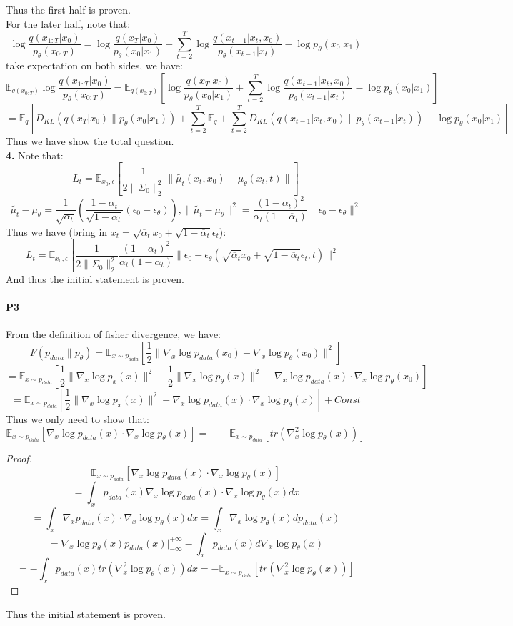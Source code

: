 \documentclass[a4 paper,12pt]{article}
\theoremstyle{definitionstyle}
\begin{document}
Thus the first half is proven.\\
For the later half, note that:
\[
  \log\frac{q(x_{1:T}|x_0)}{p_\theta(x_{0:T})}=\log\frac{q(x_T|x_0)}{p_\theta(x_0|x_1)}+\sum_{t=2}^T\log\frac{q(x_{t-1}|x_t,x_0)}{p_\theta(x_{t-1}|x_t)}-\log p_\theta(x_0|x_1)
\]
take expectation on both sides, we have:
\[
  \mathbb{E}_{q(x_{0:T})}\log\frac{q(x_{1:T}|x_0)}{p_\theta(x_{0:T})}=\mathbb{E}_{q(x_{0:T})}\left[\log\frac{q(x_T|x_0)}{p_\theta(x_0|x_1)}+\sum_{t=2}^T\log\frac{q(x_{t-1}|x_t,x_0)}{p_\theta(x_{t-1}|x_t)}-\log p_\theta(x_0|x_1)\right]
\]
\[
  =\mathbb{E}_q \left[D_{KL}(q(x_T|x_0)\|p_\theta(x_0|x_1))+\sum_{t=2}^T\mathbb{E}_q+\sum_{t=2}^TD_{KL}(q(x_{t-1}|x_t,x_0)\|p_\theta(x_{t-1}|x_t))-\log p_\theta(x_0|x_1)\right]
\]
Thus we have show the total question.\\
\textbf{4.} Note that:
\[
  L_t=\mathbb{E}_{x_0,\epsilon}\left[\frac{1}{2\|\Sigma_0\|_2^2}\|\tilde{\mu_t}(x_t,x_0)-\mu_\theta(x_t,t)\|\right]
\]
\[
  \tilde{\mu_t}-\mu_\theta=\frac{1}{\sqrt{\alpha_t}}(\frac{1-\alpha_t}{\sqrt{1-\overline\alpha_t}}(\epsilon_0-\epsilon_\theta)),\|\tilde{\mu_t}-\mu_\theta\|^2=\frac{(1-\alpha_t)^2}{\alpha_t(1-\overline\alpha_t)}\|\epsilon_0-\epsilon_\theta\|^2
\]
Thus we have (bring in $x_t=\sqrt{\overline\alpha_t}x_0+\sqrt{1-\overline\alpha_t}\epsilon_t$):
\[
  L_t=\mathbb{E}_{x_0,\epsilon}\left[\frac{1}{2\|\Sigma_0\|_2^2}\frac{(1-\alpha_t)^2}{\alpha_t(1-\overline\alpha_t)}\|\epsilon_0-\epsilon_\theta(\sqrt{\overline\alpha_t}x_0+\sqrt{1-\overline\alpha_t}\epsilon_t,t)\|^2\right]
\]
And thus the initial statement is proven.
\paragraph{P3}
From the definition of fisher divergence, we have:
\[
  F(p_{data}\|p_\theta)=\mathbb{E}_{x\sim p_{data}}\left[\frac{1}{2}\|\nabla_x\log p_{data}(x_0)-\nabla_x\log p_\theta(x_0)\|^2\right]
\]
\[
  =\mathbb{E}_{x\sim p_{data}}\left[\frac 1 2\|\nabla_x \log p_x(x)\|^2+\frac{1}{2}\|\nabla_x \log p_\theta(x)\|^2-\nabla_x\log p_{data}(x)\cdot\nabla_x\log p_\theta(x_0)\right]
\]
\[
  =\mathbb{E}_{x\sim p_{data}}\left[\frac 1 2\|\nabla_x \log p_x(x)\|^2-\nabla_x\log p_{data}(x)\cdot\nabla_x\log p_\theta(x)\right]+Const
\]
Thus we only need to show that:
\[
  \mathbb{E}_{x\sim p_{data}}\left[\nabla_x\log p_{data}(x)\cdot\nabla_x\log p_\theta(x)\right]=--\mathbb{E}_{x\sim p_{data}}\left[tr(\nabla_x^2\log p_{\theta}(x))\right]
\]
\begin{proof}
\[
  \mathbb{E}_{x\sim p_{data}}\left[\nabla_x\log p_{data}(x)\cdot\nabla_x\log p_\theta(x)\right]
\]
\[
  =\int_x p_{data}(x)\nabla_x\log p_{data}(x)\cdot\nabla_x\log p_\theta(x)dx
\]
\[
  =\int_x \nabla_x p_{data}(x)\cdot\nabla_x\log p_\theta(x)dx=\int_x \nabla_x \log p_{\theta}(x)d p_{data}(x)
\]
\[
  =\nabla_x \log p_{\theta}(x)p_{data}(x)|_{-\infty}^{+\infty}-\int_x p_{data}(x)d\nabla_x \log p_{\theta}(x)
\]
\[
  =-\int_x p_{data}(x)tr(\nabla_x^2\log p_{\theta}(x))dx=-\mathbb{E}_{x\sim p_{data}}\left[tr(\nabla_x^2\log p_{\theta}(x))\right]
\]
\end{proof}
Thus the initial statement is proven.\\
\end{document}
